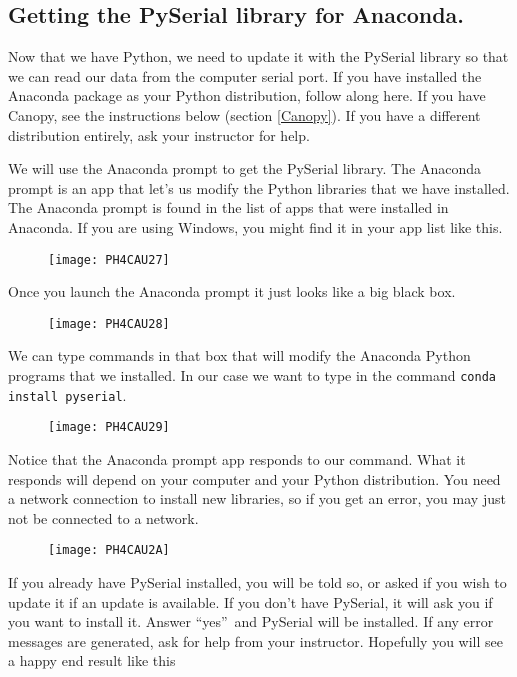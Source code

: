 \subsection{Getting the PySerial library for Anaconda.}

Now that we have Python, we need to update it with the PySerial library so
that we can read our data from the computer serial port. If you have
installed the Anaconda package as your Python distribution, follow along
here. If you have Canopy, see the instructions below (section \ref{Canopy}).
If you have a different distribution entirely, ask your instructor for help.

We will use the Anaconda prompt to get the PySerial library. The Anaconda
prompt is an app that let's us modify the Python libraries that we have
installed. The Anaconda prompt is found in the list of apps that were
installed in Anaconda. If you are using Windows, you might find it in your
app list like this.

\begin{figure}[h!]
	\centering
	\texttt{[image: PH4CAU27]}
\end{figure}

Once you launch the Anaconda prompt it just looks like a big black box. 

\begin{figure}[h!]
	\centering
	\texttt{[image: PH4CAU28]}
\end{figure}

We can type commands in that box that will modify the Anaconda Python programs that we installed. In our case we want to type in the command \texttt{conda install pyserial}.

\begin{figure}[h!]
	\centering
	\texttt{[image: PH4CAU29]}
\end{figure}

Notice that the Anaconda prompt app responds to our command. What it
responds will depend on your computer and your Python distribution. You need
a network connection to install new libraries, so if you get an error, you
may just not be connected to a network.

\begin{figure}[h!]
	\centering
	\texttt{[image: PH4CAU2A]}
\end{figure}

If you already have PySerial
installed, you will be told so, or asked if you wish to update it if an
update is available. If you don't have PySerial, it will ask you if you want
to install it. Answer \textquotedblleft yes\textquotedblright\ and PySerial
will be installed. If any error messages are generated, ask for help from
your instructor. Hopefully you will see a happy end result like this 


